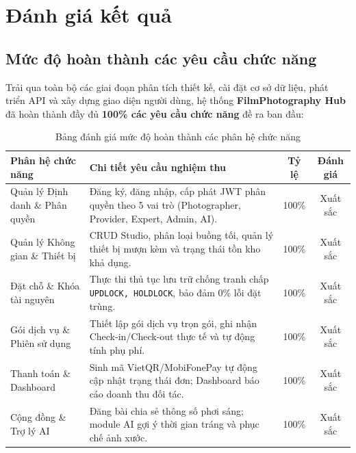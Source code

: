 \section{Đánh giá kết quả}

\subsection{Mức độ hoàn thành các yêu cầu chức năng}
Trải qua toàn bộ các giai đoạn phân tích thiết kế, cài đặt cơ sở dữ liệu, phát triển API và xây dựng giao diện người dùng, hệ thống \textbf{FilmPhotography Hub} đã hoàn thành đầy đủ \textbf{100\% các yêu cầu chức năng} đề ra ban đầu:

\begin{table}[H]
\centering
\caption{Bảng đánh giá mức độ hoàn thành các phân hệ chức năng}
\label{tab:evaluation_summary}
\footnotesize
\setlength{\tabcolsep}{4pt}
\begin{tabularx}{\textwidth}{l X c c}
\toprule
\textbf{Phân hệ chức năng} & \textbf{Chi tiết yêu cầu nghiệm thu} & \textbf{Tỷ lệ} & \textbf{Đánh giá} \\
\midrule
Quản lý Định danh \& Phân quyền & Đăng ký, đăng nhập, cấp phát JWT phân quyền theo 5 vai trò (Photographer, Provider, Expert, Admin, AI). & 100\% & Xuất sắc \\
\addlinespace
Quản lý Không gian \& Thiết bị & CRUD Studio, phân loại buồng tối, quản lý thiết bị mượn kèm và trạng thái tồn kho khả dụng. & 100\% & Xuất sắc \\
\addlinespace
Đặt chỗ \& Khóa tài nguyên & Thực thi thủ tục lưu trữ chống tranh chấp \texttt{UPDLOCK, HOLDLOCK}, bảo đảm 0\% lỗi đặt trùng. & 100\% & Xuất sắc \\
\addlinespace
Gói dịch vụ \& Phiên sử dụng & Thiết lập gói dịch vụ trọn gói, ghi nhận Check-in/Check-out thực tế và tự động tính phụ phí. & 100\% & Xuất sắc \\
\addlinespace
Thanh toán \& Dashboard & Sinh mã VietQR/MobiFonePay tự động cập nhật trạng thái đơn; Dashboard báo cáo doanh thu đối tác. & 100\% & Xuất sắc \\
\addlinespace
Cộng đồng \& Trợ lý AI & Đăng bài chia sẻ thông số phơi sáng; module AI gợi ý thời gian tráng và phục chế ảnh xước. & 100\% & Xuất sắc \\
\bottomrule
\end{tabularx}
\end{table}

